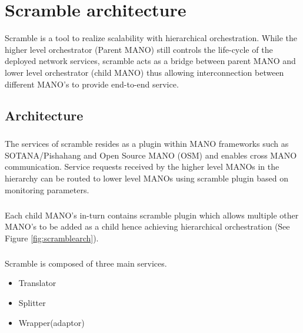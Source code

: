 \chapter{Scramble architecture}
\label{ch:Scramble architecture}

Scramble is a tool to realize scalability with hierarchical orchestration. While the higher level orchestrator (Parent MANO) still controls the life-cycle of the deployed network services, scramble acts as a bridge between parent MANO and lower level orchestrator (child MANO) thus allowing interconnection between different MANO's to provide end-to-end service.  
 
\section{Architecture}
\paragraph{}
The services of scramble resides as a plugin within MANO frameworks such as SOTANA/Pishahang and Open Source MANO (OSM) and enables cross MANO communication. Service requests received by the higher level MANOs in the hierarchy can be routed to lower level MANOs using scramble plugin based on monitoring parameters.


\paragraph{}
Each child MANO's in-turn contains scramble plugin which allows multiple other MANO's to be added as a child hence achieving hierarchical orchestration (See Figure \ref{fig:scramblearch}).

\paragraph{}

Scramble is composed of three main services.
\begin{itemize}
	\item Translator
	\item Splitter
	\item Wrapper(adaptor)
	\end{itemize} 


